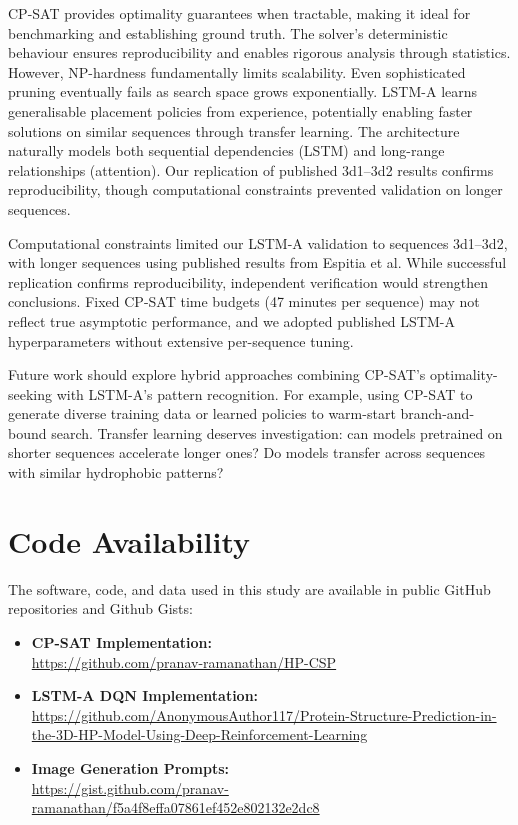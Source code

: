 \documentclass{article}
\theoremstyle{plain}
\theoremstyle{definition}
\begin{document}
CP-SAT provides optimality guarantees when tractable, making it ideal for benchmarking and establishing ground truth. The solver's deterministic behaviour ensures reproducibility and enables rigorous analysis through statistics. However, NP-hardness fundamentally limits scalability. Even sophisticated pruning eventually fails as search space grows exponentially. LSTM-A learns generalisable placement policies from experience, potentially enabling faster solutions on similar sequences through transfer learning. The architecture naturally models both sequential dependencies (LSTM) and long-range relationships (attention). Our replication of published 3d1--3d2 results confirms reproducibility, though computational constraints prevented validation on longer sequences. 

Computational constraints limited our LSTM-A validation to sequences 3d1--3d2, with longer sequences using published results from Espitia et al. While successful replication confirms reproducibility, independent verification would strengthen conclusions. Fixed CP-SAT time budgets (47 minutes per sequence) may not reflect true asymptotic performance, and we adopted published LSTM-A hyperparameters without extensive per-sequence tuning.

Future work should explore hybrid approaches combining CP-SAT's optimality-seeking with LSTM-A's pattern recognition. For example, using CP-SAT to generate diverse training data or learned policies to warm-start branch-and-bound search. Transfer learning deserves investigation: can models pretrained on shorter sequences accelerate longer ones? Do models transfer across sequences with similar hydrophobic patterns?

\section*{Code Availability}

The software, code, and data used in this study are available in public GitHub repositories and Github Gists:

\begin{itemize}
    \raggedright%
    \item \textbf{CP-SAT Implementation:}\\
    \url{https://github.com/pranav-ramanathan/HP-CSP}
    \item \textbf{LSTM-A DQN Implementation:}\\
    \url{https://github.com/AnonymousAuthor117/Protein-Structure-Prediction-in-the-3D-HP-Model-Using-Deep-Reinforcement-Learning}
    \item \textbf{Image Generation Prompts:}\\
    \url{https://gist.github.com/pranav-ramanathan/f5a4f8effa07861ef452e802132e2dc8}
\end{itemize}




\end{document}

